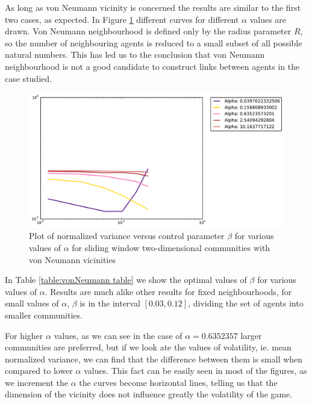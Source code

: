 As long as von Neumann vicinity is concerned the results are similar to the first two cases, as expected.
In Figure \ref{fig:von neumann vicinity partial} different curves for different $\alpha$ values are drawn.
Von Neumann neighbourhood is defined only by the radius parameter $R$, so the number of neighbouring agents is reduced to a small subset of all possible natural numbers.
This has led us to the conclusion that von Neumann neighbourhood is not a good candidate to construct links between agents in the case studied.

\begin{figure}[h]
\begin{center}
\includegraphics[scale=0.4]{images/results/vicinity_vonNeumann_n403_rounds10000_partial.pdf}
\caption{Plot of normalized variance versus control parameter $\beta$ for various values of $\alpha$  for sliding window two-dimensional communities with von Neumann vicinities}
\label{fig:von neumann vicinity partial}
\end{center}
\end{figure}

In Table \ref{table:vonNeumann table} we show the optimal values of $\beta$ for various values of $\alpha$.
Results are much alike other results for fixed neighbourhoods, for small values of $\alpha$, $\beta$ is in the interval $[0.03,0.12]$, dividing the set of agents into smaller communities.

For higher $\alpha$ values, as we can see in the case of $\alpha=0.6352357$ larger communities are preferred, but if we look ate the values of volatility, ie. mean normalized variance, we can find that the difference between them is small when compared to lower $\alpha$ values. 
This fact can be easily seen in most of the figures, as we increment the $\alpha$ the curves become horizontal lines, telling us that the dimension of the vicinity does not influence greatly the volatility of the game.

